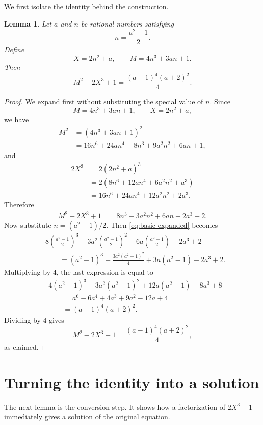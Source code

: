 \documentclass[11pt]{article}
\newtheorem{lemma}{Lemma}
\theoremstyle{remark}
\begin{document}
We first isolate the identity behind the construction.

\begin{lemma}\label{lem:identity}
Let \(a\) and \(n\) be rational numbers satisfying
\[
        n=\frac{a^2-1}{2}.
\]
Define
\[
        X=2n^2+a,
        \qquad
        M=4n^3+3an+1.
\]
Then
\[
        M^2-2X^3+1=\frac{(a-1)^4(a+2)^2}{4}.
\]
\end{lemma}

\begin{proof}
We expand first without substituting the special value of \(n\).  Since
\[
        M=4n^3+3an+1,
        \qquad
        X=2n^2+a,
\]
we have
\begin{align*}
 M^2
 &= (4n^3+3an+1)^2 \\
 &=16n^6+24an^4+8n^3+9a^2n^2+6an+1,
\end{align*}
and
\begin{align*}
 2X^3
 &=2(2n^2+a)^3 \\
 &=2(8n^6+12an^4+6a^2n^2+a^3) \\
 &=16n^6+24an^4+12a^2n^2+2a^3.
\end{align*}
Therefore
\begin{align}\label{eq:basic-expanded}
 M^2-2X^3+1
 &=8n^3-3a^2n^2+6an-2a^3+2.
\end{align}
Now substitute \(n=(a^2-1)/2\).  Then \eqref{eq:basic-expanded} becomes
\begin{align*}
&8\left(\frac{a^2-1}{2}\right)^3
 -3a^2\left(\frac{a^2-1}{2}\right)^2
 +6a\left(\frac{a^2-1}{2}\right)
 -2a^3+2 \\
&\qquad = (a^2-1)^3-\frac{3a^2(a^2-1)^2}{4}+3a(a^2-1)-2a^3+2.
\end{align*}
Multiplying by \(4\), the last expression is equal to
\begin{align*}
&4(a^2-1)^3-3a^2(a^2-1)^2+12a(a^2-1)-8a^3+8 \\
&\qquad = a^6-6a^4+4a^3+9a^2-12a+4 \\
&\qquad = (a-1)^4(a+2)^2.
\end{align*}
Dividing by \(4\) gives
\[
        M^2-2X^3+1=\frac{(a-1)^4(a+2)^2}{4},
\]
as claimed.
\end{proof}

\section{Turning the identity into a solution}

The next lemma is the conversion step.  It shows how a factorization of \(2X^3-1\) immediately gives a solution of the original equation.
\end{document}

